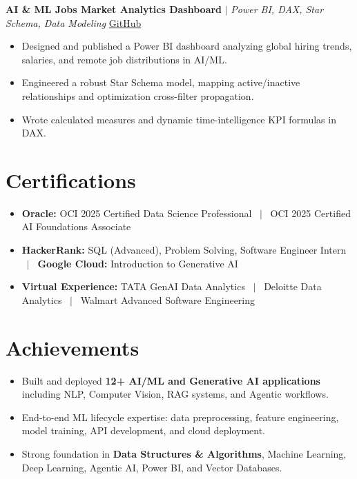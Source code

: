 \documentclass[a4paper,9pt]{article}
\newcommand{\resumeItem}[1]{\item\small #1}
\begin{document}
\vspace{1.5pt}
\noindent\textbf{AI \& ML Jobs Market Analytics Dashboard} $|$ \textit{Power BI, DAX, Star Schema, Data Modeling} \hfill
\href{https://github.com/hsachan295-source/Power-BI-Portfolio}{\small GitHub}
\begin{itemize}
\resumeItem{Designed and published a Power BI dashboard analyzing global hiring trends, salaries, and remote job distributions in AI/ML.}
\resumeItem{Engineered a robust Star Schema model, mapping active/inactive relationships and optimization cross-filter propagation.}
\resumeItem{Wrote calculated measures and dynamic time-intelligence KPI formulas in DAX.}
\end{itemize}

\vspace{-2mm}

\section{Certifications}
\begin{itemize}
\resumeItem{\textbf{Oracle:} OCI 2025 Certified Data Science Professional ~$|$~ OCI 2025 Certified AI Foundations Associate}
\resumeItem{\textbf{HackerRank:} SQL (Advanced), Problem Solving, Software Engineer Intern ~$|$~ \textbf{Google Cloud:} Introduction to Generative AI}
\resumeItem{\textbf{Virtual Experience:} TATA GenAI Data Analytics ~$|$~ Deloitte Data Analytics ~$|$~ Walmart Advanced Software Engineering}
\end{itemize}

\vspace{-2mm}

\section{Achievements}
\begin{itemize}
\resumeItem{Built and deployed \textbf{12+ AI/ML and Generative AI applications} including NLP, Computer Vision, RAG systems, and Agentic workflows.}
\resumeItem{End-to-end ML lifecycle expertise: data preprocessing, feature engineering, model training, API development, and cloud deployment.}
\resumeItem{Strong foundation in \textbf{Data Structures \& Algorithms}, Machine Learning, Deep Learning, Agentic AI, Power BI, and Vector Databases.}
\end{itemize}
\end{document}
